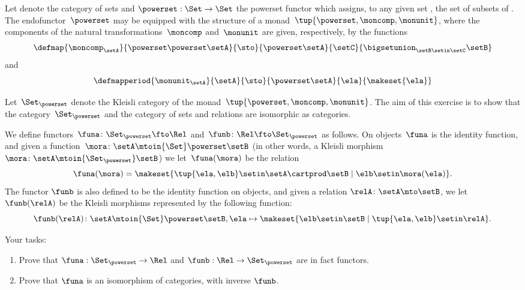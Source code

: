 \begin{gradedexercise}
    \label{ex:HwkRelKleisli}

    Let \Set denote the category of sets and $\powerset : \Set \to \Set$ the powerset functor which assigns, to any given set \setA, the set of subsets of \setA.
    The endofunctor~$\powerset$ may be equipped with the structure of a monad~$\tup{\powerset, \moncomp, \monunit}$, where the components of the natural transformations~$\moncomp$ and~$\monunit$ are given, respectively, by the functions
    \begin{equation}
        \defmap{\moncomp_{\setA}}{\powerset \powerset \setA}{\sto}{\powerset \setA}{\setC}{\bigsetunion_{\setB \setin \setC} \setB}
    \end{equation}
    and
    \begin{equation}
        \defmapperiod{\monunit_{\setA}}{\setA}{\sto}{\powerset \setA}{\ela}{\makeset{\ela}}
    \end{equation}

    Let~$\Set_{\powerset}$ denote the Kleisli category of the monad~$\tup{\powerset, \moncomp, \monunit}$.
    The aim of this exercise is to show that the category~$\Set_{\powerset}$ and the category \Rel of sets and relations are isomorphic as categories.

    We define functors~$\funa\colon \Set_{\powerset} \fto \Rel$ and~$\funb\colon \Rel \fto \Set_{\powerset}$ as follows.
    On objects~$\funa$ is the identity function, and given a function~$\mora \colon \setA \mtoin{\Set} \powerset \setB$ (in other words, a Kleisli morphism~$\mora \colon \setA \mtoin{\Set_{\powerset}} \setB$) we let~$\funa(\mora)$ be the relation
    \begin{equation}
        \funa(\mora) = \makeset{\tup{\ela, \elb} \setin \setA \cartprod \setB \mid \elb \setin \mora(\ela)}.
    \end{equation}
    The functor $\funb$ is also defined to be the identity function on objects, and given a relation $\relA \colon \setA \mto \setB$, we let $\funb(\relA)$ be the Kleisli morphisms represented by the following function:
    \begin{equation}
        \funb(\relA)\colon \setA \mtoin{\Set} \powerset \setB, \ela \mapsto \makeset{\elb \setin\setB \mid \tup{\ela, \elb} \setin \relA}.
    \end{equation}

    Your tasks:
    \begin{enumerate}
        \item Prove that $\funa: \Set_{\powerset} \to \Rel$ and $\funb: \Rel \to \Set_{\powerset}$ are in fact functors.
        \item Prove that $\funa$ is an isomorphism of categories, with inverse $\funb$.
    \end{enumerate}
\end{gradedexercise}

